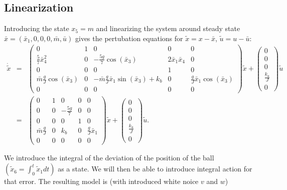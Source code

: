 \subsection{Linearization}

Introducing the state $x_{5}=m$ and linearizing the system around
steady state $\bar{x}=(\bar{x}_{1},0,0,0,\bar{m},\bar{u})$ gives
the pertubation equations for $\tilde{x}=x-\bar{x}$, $\tilde{u}=u-\bar{u}$:
\begin{eqnarray*}
\dot{\tilde{x}} & = & \begin{pmatrix}0 & 1 & 0 & 0 & 0\\
\frac{5}{7}\bar{x}_{4}^{2} & 0 & -\frac{5g}{7}\cos(\bar{x}_{3}) & 2\bar{x}_{1}\bar{x}_{4} & 0\\
0 & 0 & 0 & 1 & 0\\
\bar{m}\frac{g}{J}\cos(\bar{x}_{3}) & 0 & -\bar{m}\frac{g}{J}\bar{x}_{1}\sin(\bar{x}_{3})+k_{b} & 0 & \frac{g}{J}\bar{x}_{1}\cos(\bar{x}_{3})\\
0 & 0 & 0 & 0 & 0
\end{pmatrix}\tilde{x}+\begin{pmatrix}0\\
0\\
0\\
\frac{k_{u}}{J}\\
0
\end{pmatrix}\tilde{u}\\
 & = & \begin{pmatrix}0 & 1 & 0 & 0 & 0\\
0 & 0 & -\frac{5g}{7} & 0 & 0\\
0 & 0 & 0 & 1 & 0\\
\bar{m}\frac{g}{J} & 0 & k_{b} & 0 & \frac{g}{J}\bar{x}_{1}\\
0 & 0 & 0 & 0 & 0
\end{pmatrix}\tilde{x}+\begin{pmatrix}0\\
0\\
0\\
\frac{k_{u}}{J}\\
0
\end{pmatrix}\tilde{u}.
\end{eqnarray*}


We introduce the integral of the deviation of the position of the
ball $(\tilde{x}_{6}=\int_{0}^{t}\tilde{x}_{1}dt)$ as a state. We
will then be able to introduce integral action for that error. The
resulting model is (with introduced white noice $v$ and $w$)

